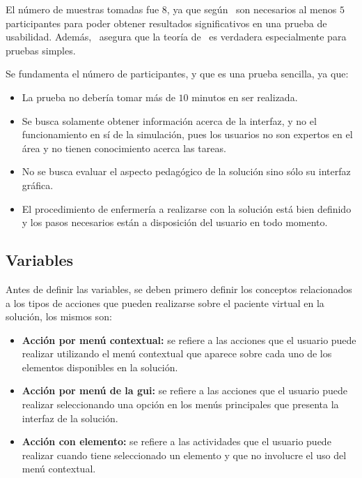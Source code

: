 El número de muestras tomadas fue 8, ya que según~\cite{nielsen2000} son
necesarios al menos $5$ participantes para poder obtener resultados
significativos en una prueba de usabilidad. Además,~\cite{ritch2009} asegura que
la teoría de~\cite{nielsen2000} es verdadera especialmente para pruebas simples. 

Se fundamenta el número de participantes, y que es una prueba sencilla, ya que:

\begin{itemize}

\item La prueba no debería tomar más de $10$ minutos en ser realizada.

\item Se busca solamente obtener información acerca de la interfaz, y no el
    funcionamiento en sí de la simulación, pues los usuarios no son expertos en
    el área y no tienen conocimiento acerca las tareas.

\item No se busca evaluar el aspecto pedagógico de la solución sino sólo su interfaz gráfica.

\item El procedimiento de enfermería a realizarse con la solución está bien definido 
y los pasos necesarios están a disposición del usuario en todo momento.

\end{itemize}

\subsection{Variables}
\label{sec:evaluacion_interfaz_variables}

Antes de definir las variables, se deben primero definir los conceptos 
relacionados a los tipos de acciones que pueden realizarse sobre el paciente 
virtual en la solución, los mismos son:

\begin{itemize}
\item \textbf{Acción por menú contextual:} se refiere a las acciones que el usuario 
    puede realizar utilizando el menú contextual que aparece sobre cada uno de los elementos 
    disponibles en la solución.
\item \textbf{Acción por menú de la \Gls{gui}:} se refiere a las 
    acciones que el usuario puede realizar seleccionando una opción en los menús 
    principales que presenta la interfaz de la solución.
\item \textbf{Acción con elemento:} se refiere a las actividades que el usuario 
    puede realizar cuando tiene seleccionado un elemento y que no involucre el 
    uso del menú contextual.
\end{itemize}


